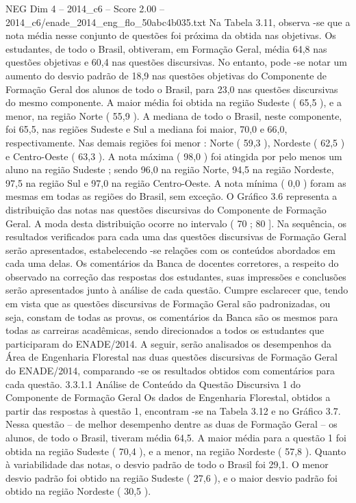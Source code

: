 \begin{textsample}{NEG Dim 4 – 2014\_c6 – Score 2.00 – 2014\_c6/enade\_2014\_eng\_flo\_50abc4b035.txt}
Na Tabela 3.11, observa -se que a nota média nesse conjunto de questões foi próxima da obtida nas objetivas.
Os estudantes, de todo o Brasil, obtiveram, em Formação Geral, média 64,8 nas questões objetivas e 60,4 nas questões discursivas.
No entanto, pode -se notar um aumento do desvio padrão de 18,9 nas questões objetivas do Componente de Formação Geral dos alunos de todo o Brasil, para 23,0 nas questões discursivas do mesmo componente.
A maior média foi obtida na região Sudeste ( 65,5 ), e a menor, na região Norte ( 55,9 ).
A mediana de todo o Brasil, neste componente, foi 65,5, nas regiões Sudeste e Sul a mediana foi maior, 70,0 e 66,0, respectivamente.
Nas demais regiões foi menor : Norte ( 59,3 ), Nordeste ( 62,5 ) e Centro-Oeste ( 63,3 ).
A nota máxima ( 98,0 ) foi atingida por pelo menos um aluno na região Sudeste ; sendo 96,0 na região Norte, 94,5 na região Nordeste, 97,5 na região Sul e 97,0 na região Centro-Oeste.
A nota mínima ( 0,0 ) foram as mesmas em todas as regiões do Brasil, sem exceção.
O Gráfico 3.6 representa a distribuição das notas nas questões discursivas do Componente de Formação Geral.
A moda desta distribuição ocorre no intervalo ( 70 ; 80 ].
Na sequência, os resultados verificados para cada uma das questões discursivas de Formação Geral serão apresentados, estabelecendo -se relações com os conteúdos abordados em cada uma delas.
Os comentários da Banca de docentes corretores, a respeito do observado na correção das respostas dos estudantes, suas impressões e conclusões serão apresentados junto à análise de cada questão.
Cumpre esclarecer que, tendo em vista que as questões discursivas de Formação Geral são padronizadas, ou seja, constam de todas as provas, os comentários da Banca são os mesmos para todas as carreiras acadêmicas, sendo direcionados a todos os estudantes que participaram do ENADE/2014.
A seguir, serão analisados os desempenhos da Área de Engenharia Florestal nas duas questões discursivas de Formação Geral do ENADE/2014, comparando -se os resultados obtidos com comentários para cada questão. 3.3.1.1 Análise de Conteúdo da Questão Discursiva 1 do Componente de Formação Geral Os dados de Engenharia Florestal, obtidos a partir das respostas à questão 1, encontram -se na Tabela 3.12 e no Gráfico 3.7.
Nessa questão – de melhor desempenho dentre as duas de Formação Geral – os alunos, de todo o Brasil, tiveram média 64,5.
A maior média para a questão 1 foi obtida na região Sudeste ( 70,4 ), e a menor, na região Nordeste ( 57,8 ).
Quanto à variabilidade das notas, o desvio padrão de todo o Brasil foi 29,1.
O menor desvio padrão foi obtido na região Sudeste ( 27,6 ), e o maior desvio padrão foi obtido na região Nordeste ( 30,5 ).

\end{textsample}
